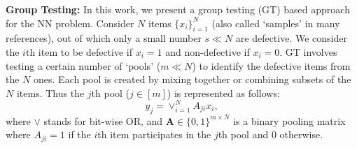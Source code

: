\documentclass[sigconf, anonymous, review]{acmart}
\begin{document}
\textbf{Group Testing:} In this work, we present a group testing (GT) based approach for the NN problem. Consider $N$ items $\{x_i\}_{i=1}^N$ (also called `samples' in many references), out of which only a small number $s \ll N$ are defective. We consider the $i$th item to be defective if $x_i = 1$ and non-defective if $x_i = 0$. GT involves testing a certain number of `pools' ($m \ll N$) to identify the defective items from the $N$ ones. Each pool is created by mixing together or combining subsets of the $N$ items. Thus the $j$th pool ($j \in [m]$) is represented as follows:
\begin{equation}
y_j = \vee_{i=1}^N A_{ji} x_i,   
\end{equation}
where $\vee$ stands for bit-wise OR, and $\boldsymbol{A} \in \{0,1\}^{m \times N}$ is a binary pooling matrix where $A_{ji} = 1$ if the $i$th item participates in the $j$th pool and 0 otherwise. 
\end{document}
